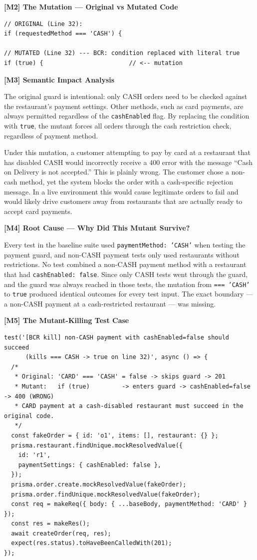 \documentclass[12pt, a4paper]{article}
\begin{document}
\textbf{[M2] The Mutation --- Original vs Mutated Code}

\begin{lstlisting}[caption={Mutant 2: Original vs Mutated (Line 32)}]
// ORIGINAL (Line 32):
if (requestedMethod === 'CASH') {

// MUTATED (Line 32) --- BCR: condition replaced with literal true
if (true) {                        // <-- mutation
\end{lstlisting}

\textbf{[M3] Semantic Impact Analysis}

The original guard is intentional: only CASH orders need to be checked against the restaurant's payment settings. Other methods, such as card payments, are always permitted regardless of the \texttt{cashEnabled} flag. By replacing the condition with \texttt{true}, the mutant forces all orders through the cash restriction check, regardless of payment method.

Under this mutation, a customer attempting to pay by card at a restaurant that has disabled CASH would incorrectly receive a 400 error with the message ``Cash on Delivery is not accepted.'' This is plainly wrong. The customer chose a non-cash method, yet the system blocks the order with a cash-specific rejection message. In a live environment this would cause legitimate orders to fail and would likely drive customers away from restaurants that are actually ready to accept card payments.

\textbf{[M4] Root Cause --- Why Did This Mutant Survive?}

Every test in the baseline suite used \texttt{paymentMethod: 'CASH'} when testing the payment guard, and non-CASH payment tests only used restaurants without restrictions. No test combined a non-CASH payment method with a restaurant that had \texttt{cashEnabled: false}. Since only CASH tests went through the guard, and the guard was always reached in those tests, the mutation from \texttt{=== 'CASH'} to \texttt{true} produced identical outcomes for every test input. The exact boundary --- a non-CASH payment at a cash-restricted restaurant --- was missing.

\textbf{[M5] The Mutant-Killing Test Case}

\begin{lstlisting}[caption={Test that kills Mutant 2}]
test('[BCR kill] non-CASH payment with cashEnabled=false should succeed
      (kills === CASH -> true on line 32)', async () => {
  /*
   * Original: 'CARD' === 'CASH' = false -> skips guard -> 201
   * Mutant:   if (true)         -> enters guard -> cashEnabled=false -> 400 (WRONG)
   * CARD payment at a cash-disabled restaurant must succeed in the original code.
   */
  const fakeOrder = { id: 'o1', items: [], restaurant: {} };
  prisma.restaurant.findUnique.mockResolvedValue({
    id: 'r1',
    paymentSettings: { cashEnabled: false },
  });
  prisma.order.create.mockResolvedValue(fakeOrder);
  prisma.order.findUnique.mockResolvedValue(fakeOrder);
  const req = makeReq({ body: { ...baseBody, paymentMethod: 'CARD' } });
  const res = makeRes();
  await createOrder(req, res);
  expect(res.status).toHaveBeenCalledWith(201);
});
\end{lstlisting}
\end{document}
